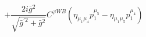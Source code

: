 %
\begin{dmath*}
%
  +  \frac{2 i {\bar g}{}^2}{\sqrt{{\bar g}^{\prime 2} + {\bar g}{}^2}}C^{ \varphi  WB} \left(\eta_{\mu_1 \mu_4} p_1^{\mu_5} - \eta_{\mu_1 \mu_5} p_1^{\mu_4}\right)
%
\end{dmath*}
%
